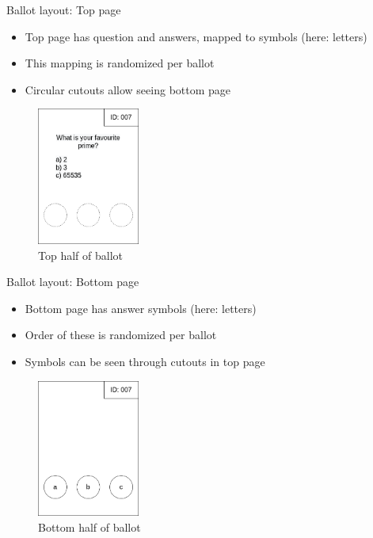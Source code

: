\documentclass{beamer}
\begin{document}
\begin{frame}{Ballot layout: Top page}
	\begin{itemize}
		\item Top page has question and answers, mapped to symbols (here: letters)
		\item This mapping is randomized per ballot
		\item Circular cutouts allow seeing bottom page
	\end{itemize}
	\begin{figure}
		\centering
		\includegraphics[width=0.3\textwidth]{../resources/high_level_ballot_top.drawio.png}
		\caption{Top half of ballot}
	\end{figure}
\end{frame}

\begin{frame}{Ballot layout: Bottom page}
	\begin{itemize}
		\item Bottom page has answer symbols (here: letters)
		\item Order of these is randomized per ballot
		\item Symbols can be seen through cutouts in top page
	\end{itemize}
	\begin{figure}
		\centering
		\includegraphics[width=0.3\textwidth]{../resources/high_level_ballot_bottom.drawio.png}
		\caption{Bottom half of ballot}
	\end{figure}
\end{frame}
\end{document}
